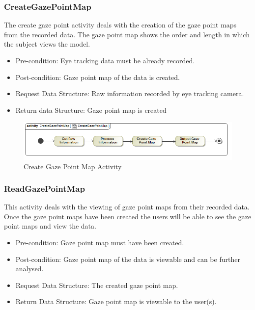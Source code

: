 	\subsubsection{CreateGazePointMap}
The create gaze point activity deals with the creation of the gaze point maps from the recorded data. The gaze point map shows the order and length in which the subject views the model.
	\begin{itemize}
		\item Pre-condition: Eye tracking data must be already recorded.
		\item Post-condition: Gaze point map of the data is created.
		\item Request Data Structure: Raw information recorded by eye tracking camera.
		\item Return data Structure: Gaze point map is created
	\end{itemize}
	\begin{figure}[!ht]
		\centering
		\includegraphics[scale=0.5,width=15cm,keepaspectratio]{Diagrams/Activity_Diagram__CreateGazePointMap__CreateGazePointMap.png}
		\caption{Create Gaze Point Map Activity}
	\end{figure}
	
	\subsubsection{ReadGazePointMap}
	This activity deals with the viewing of gaze point maps from their recorded data. Once the gaze point maps have been created the users will be able to see the gaze point maps and view the data.
	\begin{itemize}
		\item Pre-condition: Gaze point map must have been created.
		\item Post-condition: Gaze point map of the data is viewable and can be further analysed.
		\item Request Data Structure: The created gaze point map.
		\item Return Data Structure: Gaze point map is viewable to the user(s).
	\end{itemize}
	
